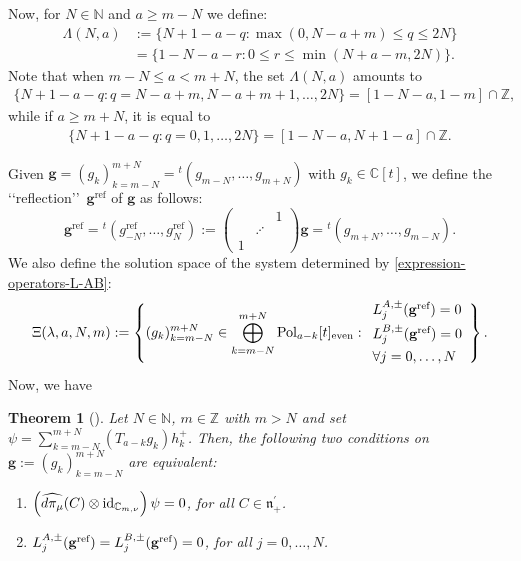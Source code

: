 \documentclass[12pt, pdflatex, a4paper]{article}
\theoremstyle{plain}
\newtheorem{thm}{Theorem}[section]
\theoremstyle{definition}
\def\C{{\mathbb C}}
\def\id{\text{\normalfont{id}}}
\def\N{{\mathbb N}}
\def\n{\mathfrak{n}}
\def\Pol{\text{\normalfont{Pol}}}
\def\Z{{\mathbb Z}}
\begin{document}
 
Now, for $N \in \N$ and $a \geq m-N$ we define:
\begin{equation}\label{def-lambda-set}
\begin{aligned}
\Lambda(N,a) &:= \{N+1-a-q : \max(0, N-a+m) \leq q \leq 2N\}\\
& =\{1-N-a-r: 0\leq r \leq  \min(N+a-m, 2N)\}.
\end{aligned}
\end{equation}
Note that when $m-N \leq a < m+N$, the set $\Lambda(N, a)$ amounts to
\begin{align*}
\{N+1-a-q : q = N-a+m, N-a+m+1, \ldots, 2N\} = [1-N-a, 1-m]\cap \Z,
\end{align*}
while if $a \geq m+N$, it is equal to
\begin{align*}
\{N+1-a-q : q = 0, 1, \ldots, 2N\} = [1-N-a, N+1-a]\cap \Z.
\end{align*}

Given $\mathbf{g} = (g_k)_{k = m-N}^{m+N} = {}^t(g_{m-N}, \ldots, g_{m+N})$ with $g_k \in \C[t]$, we define the \lq\lq reflection\rq\rq\, $\mathbf{g}^\text{ref}$ of $\mathbf{g}$ as follows:
\begin{equation*}
\mathbf{g}^\text{ref} = {}^t(g_{-N}^\text{ref}, \ldots, g_N^\text{ref}) := \begin{pmatrix}
& & 1\\
& \iddots &\\
1 & &
\end{pmatrix}\mathbf{g} = {}^t(g_{m+N}, \ldots, g_{m-N}).
\end{equation*}
We also define the solution space of the system determined by \eqref{expression-operators-L-AB}:
\begin{equation}\label{equation-space}
\Xi(\lambda, a, N, m) := \left\{(g_k)_{k=m-N}^{m+N} \in \bigoplus_{k = m-N}^{m+N} \Pol_{a-k}[t]_\text{{\normalfont{even}}} : \begin{array}{l}
L_j^{A,\pm}(\mathbf{g}^\text{ref}) = 0\\[4pt]
L_j^{B,\pm}(\mathbf{g}^\text{ref}) = 0\\[4pt]
\forall j = 0, \dots, N
\end{array}
\right\}.
\end{equation}
Now, we have
\begin{thm}[{\cite[Thm. 5.2]{Per-Val24}}]\label{Thm-findingequations} Let $N \in \N$, $m \in \Z$ with $m > N$ and set $\psi = \sum_{k = m-N}^{m+N}\left(T_{a-k}g_k\right)h_k^+$. Then, the following two conditions on $\mathbf{g} := (g_k)_{k = m-N}^{m+N}$ are equivalent:
\begin{enumerate}[label=\normalfont{(\roman*)}, topsep=2pt]
\setlength{\itemsep}{3pt}
\item $\left(\widehat{d\pi_\mu}(C)\otimes \id_{\C_{m,\nu}}\right)\psi = 0$, for all $C \in \n_+^\prime$.
\item $L_j^{A, \pm}(\mathbf{g}^{\normalfont\text{ref}}) = L_j^{B, \pm}(\mathbf{g}^{\normalfont\text{ref}}) = 0$, for all $j = 0, \dots, N$.
\end{enumerate}
\end{thm}
\end{document}
